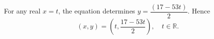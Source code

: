 For any real $x=t$, the equation determines $y=\dfrac{(17-53t)}{2}$. Hence
\[
\boxed{(x,y)=\left(t,\dfrac{17-53t}{2}\right),\quad t\in\mathbb R}.
\]
